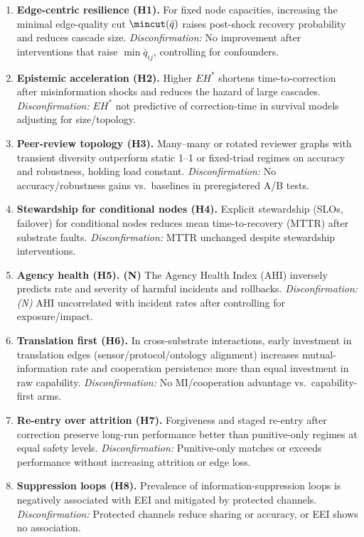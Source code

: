 \documentclass[12pt]{article}
\begin{document}
\begin{enumerate}[leftmargin=1.2em]
\item \textbf{Edge-centric resilience (H1).} For fixed node capacities, increasing the minimal edge-quality cut $\mincut(\bar{q})$ raises post-shock recovery probability and reduces cascade size. \emph{Disconfirmation:} No improvement after interventions that raise $\min\bar{q}_{ij}$, controlling for confounders.
\item \textbf{Epistemic acceleration (H2).} Higher $EH^{\ast}$ shortens time-to-correction after misinformation shocks and reduces the hazard of large cascades. \emph{Disconfirmation:} $EH^{\ast}$ not predictive of correction-time in survival models adjusting for size/topology.
\item \textbf{Peer-review topology (H3).} Many--many or rotated reviewer graphs with transient diversity outperform static 1--1 or fixed-triad regimes on accuracy and robustness, holding load constant. \emph{Disconfirmation:} No accuracy/robustness gains vs.\ baselines in preregistered A/B tests.
\item \textbf{Stewardship for conditional nodes (H4).} Explicit stewardship (SLOs, failover) for conditional nodes reduces mean time-to-recovery (MTTR) after substrate faults. \emph{Disconfirmation:} MTTR unchanged despite stewardship interventions.
\item \textbf{Agency health (H5). (N)} The Agency Health Index (AHI) inversely predicts rate and severity of harmful incidents and rollbacks. \emph{Disconfirmation: (N)} AHI uncorrelated with incident rates after controlling for exposure/impact.
\item \textbf{Translation first (H6).} In cross-substrate interactions, early investment in translation edges (sensor/protocol/ontology alignment) increases mutual-information rate and cooperation persistence more than equal investment in raw capability. \emph{Disconfirmation:} No MI/cooperation advantage vs.\ capability-first arms.
\item \textbf{Re-entry over attrition (H7).} Forgiveness and staged re-entry after correction preserve long-run performance better than punitive-only regimes at equal safety levels. \emph{Disconfirmation:} Punitive-only matches or exceeds performance without increasing attrition or edge loss.
\item \textbf{Suppression loops (H8).} Prevalence of information-suppression loops is negatively associated with EEI and mitigated by protected channels. \emph{Disconfirmation:} Protected channels reduce sharing or accuracy, or EEI shows no association.
\end{enumerate}
\end{document}

